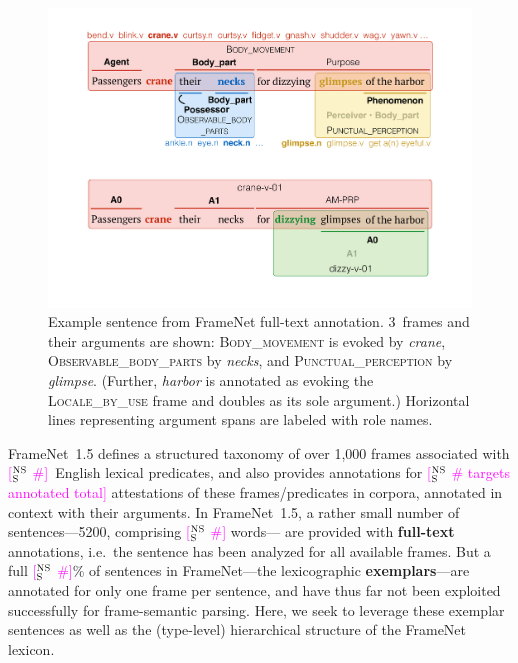 \documentclass[11pt,a4paper]{article}
\newcommand{\ensuretext}[1]{#1}
\newcommand{\nssmarker}{\ensuretext{\textcolor{magenta}{\ensuremath{^{\textsc{NS}}_{\textsc{S}}}}}}
\newcommand{\arkcomment}[3]{\ensuretext{\textcolor{#3}{[#1 #2]}}}
\newcommand{\nss}[1]{\arkcomment{\nssmarker}{#1}{magenta}}
\newcommand{\fnf}[1]{\textsc{\textsf{#1}}} %
\begin{document}
\begin{figure}
\includegraphics[width=\columnwidth]{fig/harbor-fn.pdf}
\caption{Example sentence from FrameNet full-text annotation. 
3~frames and their arguments are shown: 
\fnf{Body\_movement} is evoked by \textit{crane},
\fnf{Observable\_body\_parts} by \textit{necks}, 
and \fnf{Punctual\_perception} by \textit{glimpse}.
(Further, \textit{harbor} is annotated as evoking the \fnf{Locale\_by\_use} frame 
and doubles as its sole argument.) 
Horizontal lines representing argument spans 
are labeled with role names.}
\label{fig:harbor-fn}
\end{figure}

FrameNet~1.5 defines a structured taxonomy of over 1,000 frames associated with \nss{\#}~English lexical predicates, 
and also provides annotations for \nss{\# targets annotated total} attestations 
of these frames/predicates in corpora, annotated in context with their arguments. 
In FrameNet~1.5, a rather small number of sentences---5200, comprising \nss{\#} words---%
are provided with \textbf{full-text} annotations, i.e.~the sentence 
has been analyzed for all available frames. 
But a full \nss{\#}\% of sentences in FrameNet---the lexicographic \textbf{exemplars}---are annotated for only one frame per sentence, 
and have thus far not been exploited successfully for frame-semantic parsing.
Here, we seek to leverage these exemplar sentences 
as well as the (type-level) hierarchical structure of the FrameNet lexicon. 
\end{document}
